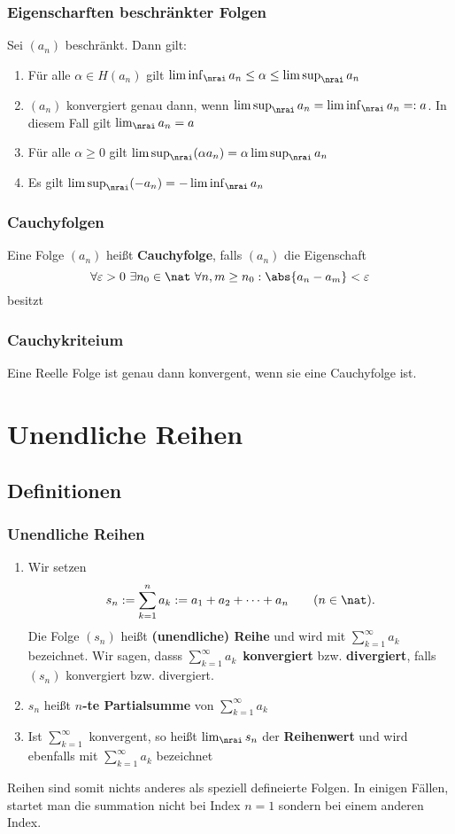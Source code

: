 \documentclass{kit}
\newcommand\f{(a_n)}
\begin{document}
    \subsubsection{Eigenscharften beschränkter Folgen}
      Sei $\f$ beschränkt. Dann gilt:
      \begin{enumerate}
        \item Für alle $\alpha\in H\f$ gilt $\liminf_\nrai a_n\le\alpha\le\limsup_\nrai a_n$
        \item $\f$ konvergiert genau dann, wenn $\limsup_\nrai a_n=\liminf_\nrai a_n=:a$. In diesem Fall gilt $\lim_\nrai a_n=a$
        \item Für alle $\alpha\ge0$ gilt $\limsup_\nrai(\alpha a_n)=\alpha\limsup_\nrai a_n$
        \item Es gilt $\limsup_\nrai(-a_n)=-\liminf_\nrai a_n$ 
      \end{enumerate}
    \subsubsection{Cauchyfolgen}
      Eine Folge $\f$ heißt \textbf{Cauchyfolge}, falls $\f$ die Eigenschaft
      $$\forall\varepsilon>0\ \exists n_0\in\nat\ \forall n,m\ge n_0:\abs{a_n-a_m}<\varepsilon$$
      besitzt
    \subsubsection{Cauchykriteium}
      Eine Reelle Folge ist genau dann konvergent, wenn sie eine Cauchyfolge ist.
\section{Unendliche Reihen}
  \subsection{Definitionen}
    \subsubsection{Unendliche Reihen}
      \begin{enumerate}
        \item Wir setzen
          $$s_n:=\sum^n_{k=1}a_k:=a_1+a_2+\dots +a_n\qquad (n\in\nat).$$
          Die Folge $(s_n)$ heißt \textbf{(unendliche) Reihe} und wird mit $\sum^\infty_{k=1}a_k$ bezeichnet. Wir sagen, dasss $\sum^\infty_{k=1}a_k$ \textbf{konvergiert} bzw. \textbf{divergiert}, falls $(s_n)$ konvergiert bzw. divergiert.
        \item $s_n$ heißt \textbf{$n$-te Partialsumme} von $\sum^\infty_{k=1}a_k$
        \item Ist $\sum^\infty_{k=1}$ konvergent, so heißt $\lim_\nrai s_n$ der \textbf{Reihenwert} und wird ebenfalls mit $\sum^\infty_{k=1}a_k$ bezeichnet
      \end{enumerate}
      Reihen sind somit nichts anderes als speziell defineierte Folgen. In einigen Fällen, startet man die summation nicht bei Index $n=1$ sondern bei einem anderen Index.
\end{document}
